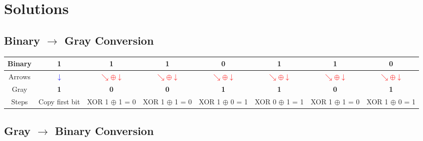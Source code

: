 



\section*{Solutions}

\subsection*{Binary $\to$ Gray Conversion}


\begin{center}
\renewcommand{\arraystretch}{1.3}
\begin{tabular}{|c|*7{c|}}
  \hline
    Binary &
    1 &    1 &    1 &    0 &    1 &    1 &    0  \\
  \hline

  Arrows &
      \textcolor{blue}{$\downarrow$} &
        \textcolor{red}{$\searrow \oplus \downarrow$} &        \textcolor{red}{$\searrow \oplus \downarrow$} &        \textcolor{red}{$\searrow \oplus \downarrow$} &        \textcolor{red}{$\searrow \oplus \downarrow$} &        \textcolor{red}{$\searrow \oplus \downarrow$} &        \textcolor{red}{$\searrow \oplus \downarrow$}  \\
  \hline

    Gray &
    \textbf{ 1 } &    \textbf{ 0 } &    \textbf{ 0 } &    \textbf{ 1 } &    \textbf{ 1 } &    \textbf{ 0 } &    \textbf{ 1 }  \\
  \hline

  Steps &
    {\scriptsize Copy first bit } &    {\scriptsize XOR 1 $\oplus$ 1 = 0 } &    {\scriptsize XOR 1 $\oplus$ 1 = 0 } &    {\scriptsize XOR 1 $\oplus$ 0 = 1 } &    {\scriptsize XOR 0 $\oplus$ 1 = 1 } &    {\scriptsize XOR 1 $\oplus$ 1 = 0 } &    {\scriptsize XOR 1 $\oplus$ 0 = 1 }  \\
  \hline
\end{tabular}
\end{center}

\bigskip

\subsection*{Gray $\to$ Binary Conversion}


